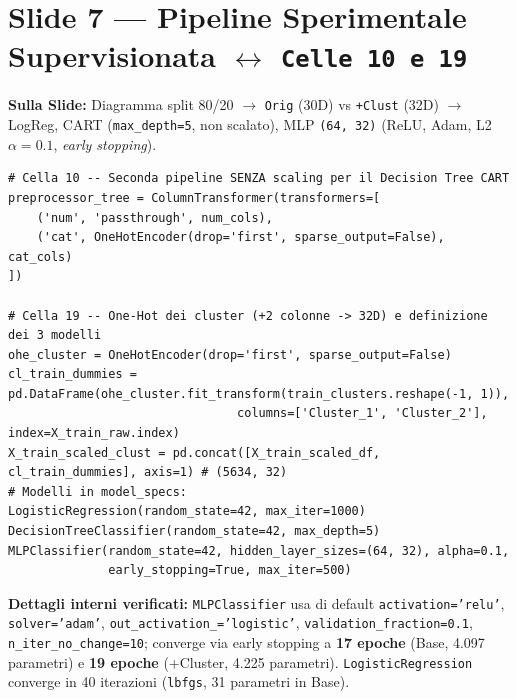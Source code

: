 \documentclass[10pt, a4paper]{article}
\begin{document}
\section*{Slide 7 --- Pipeline Sperimentale Supervisionata $\leftrightarrow$ \texttt{Celle 10 e 19}}
\noindent\textbf{Sulla Slide:} Diagramma split 80/20 $\rightarrow$ \texttt{Orig} (30D) vs \texttt{+Clust} (32D) $\rightarrow$ LogReg, CART (\texttt{max\_depth=5}, non scalato), MLP \texttt{(64, 32)} (ReLU, Adam, L2 $\alpha=0.1$, \textit{early stopping}).
\begin{lstlisting}
# Cella 10 -- Seconda pipeline SENZA scaling per il Decision Tree CART
preprocessor_tree = ColumnTransformer(transformers=[
    ('num', 'passthrough', num_cols),
    ('cat', OneHotEncoder(drop='first', sparse_output=False), cat_cols)
])

# Cella 19 -- One-Hot dei cluster (+2 colonne -> 32D) e definizione dei 3 modelli
ohe_cluster = OneHotEncoder(drop='first', sparse_output=False)
cl_train_dummies = pd.DataFrame(ohe_cluster.fit_transform(train_clusters.reshape(-1, 1)),
                                columns=['Cluster_1', 'Cluster_2'], index=X_train_raw.index)
X_train_scaled_clust = pd.concat([X_train_scaled_df, cl_train_dummies], axis=1) # (5634, 32)
# Modelli in model_specs:
LogisticRegression(random_state=42, max_iter=1000)
DecisionTreeClassifier(random_state=42, max_depth=5)
MLPClassifier(random_state=42, hidden_layer_sizes=(64, 32), alpha=0.1,
              early_stopping=True, max_iter=500)
\end{lstlisting}
\noindent\textbf{Dettagli interni verificati:} \texttt{MLPClassifier} usa di default \texttt{activation='relu'}, \texttt{solver='adam'}, \texttt{out\_\allowbreak activation\_='logistic'}, \texttt{validation\_\allowbreak fraction=0.1}, \texttt{n\_iter\_\allowbreak no\_change=10}; converge via early stopping a \textbf{17 epoche} (Base, 4.097 parametri) e \textbf{19 epoche} (+Cluster, 4.225 parametri). \texttt{LogisticRegression} converge in 40 iterazioni (\texttt{lbfgs}, 31 parametri in Base).
\end{document}
